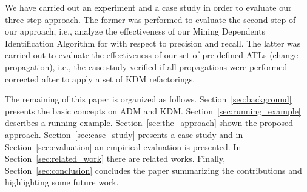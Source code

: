 We have carried out an experiment and a case study in order to evaluate our three-step approach. The former was performed to evaluate the second step of our approach, i.e., analyze the effectiveness of our Mining Dependents Identification Algorithm for with respect to precision and recall. The latter was carried out to evaluate the effectiveness of our set of pre-defined ATLs (change propagation), i.e., the case study verified if all propagations were performed corrected after to apply a set of KDM refactorings.

The remaining of this paper is organized as follows. Section~\ref{sec:background} presents the basic concepts on ADM and KDM. Section~\ref{sec:running_example} describes a running example. 
%
%
 Section~\ref{sec:the_approach} shown the proposed approach. Section~\ref{sec:case_study} presents a case study and in Section~\ref{sec:evaluation} an empirical evaluation is presented. In Section~\ref{sec:related_work} there are related works. %
Finally, Section~\ref{sec:conclusion} concludes the paper summarizing the contributions and highlighting some future work.





